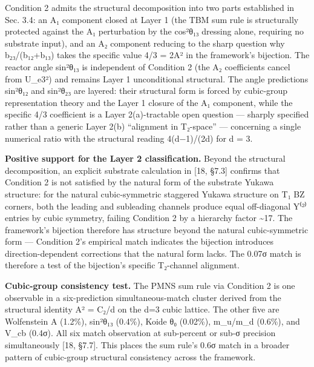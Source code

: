 \documentclass[
  11pt,
  letterpaper,
]{article}
\begin{document}
Condition 2 admits the structural decomposition into two parts
established in Sec. 3.4: an A₁ component closed at Layer 1 (the TBM sum
rule is structurally protected against the A₁ perturbation by the
cos²θ₁₃ dressing alone, requiring no substrate input), and an A₂
component reducing to the sharp question why b₂₃/(b₁₂+b₁₃) takes the
specific value 4/3 = 2A² in the framework's bijection. The reactor angle
sin²θ₁₃ is independent of Condition 2 (the A₂ coefficients cancel from
\textbar U\_e3\textbar²) and remains Layer 1 unconditional structural.
The angle predictions sin²θ₁₂ and sin²θ₂₃ are layered: their structural
form is forced by cubic-group representation theory and the Layer 1
closure of the A₁ component, while the specific 4/3 coefficient is a
Layer 2(a)-tractable open question --- sharply specified rather than a
generic Layer 2(b) ``alignment in T₂-space'' --- concerning a single
numerical ratio with the structural reading 4(d−1)/(2d) for d = 3.

\textbf{Positive support for the Layer 2 classification.} Beyond the
structural decomposition, an explicit substrate calculation in {[}18,
§7.3{]} confirms that Condition 2 is not satisfied by the natural form
of the substrate Yukawa structure: for the natural cubic-symmetric
staggered Yukawa structure on T₁ BZ corners, both the leading and
subleading channels produce equal off-diagonal Y⁽²⁾ entries by cubic
symmetry, failing Condition 2 by a hierarchy factor \textasciitilde17.
The framework's bijection therefore has structure beyond the natural
cubic-symmetric form --- Condition 2's empirical match indicates the
bijection introduces direction-dependent corrections that the natural
form lacks. The 0.07σ match is therefore a test of the bijection's
specific T₂-channel alignment.

\textbf{Cubic-group consistency test.} The PMNS sum rule via Condition 2
is one observable in a six-prediction simultaneous-match cluster derived
from the structural identity A² = C₂/d on the d=3 cubic lattice. The
other five are Wolfenstein A (1.2\%), sin²θ₁₃ (0.4\%), Koide θ₀
(0.02\%), m\_u/m\_d (0.6\%), and \textbar V\_cb\textbar{} (0.4σ). All
six match observation at sub-percent or sub-σ precision simultaneously
{[}18, §7.7{]}. This places the sum rule's 0.6σ match in a broader
pattern of cubic-group structural consistency across the framework.
\end{document}
